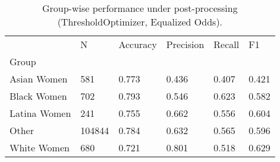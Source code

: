 \begin{table}[htbp]
\centering
\caption{Group-wise performance under post-processing (ThresholdOptimizer, Equalized Odds).}
\label{tab:12-postproc-group-metrics}
\begin{tabular}{llllll}
\toprule
 & N & Accuracy & Precision & Recall & F1 \\
Group &  &  &  &  &  \\
\midrule
Asian Women & 581 & 0.773 & 0.436 & 0.407 & 0.421 \\
Black Women & 702 & 0.793 & 0.546 & 0.623 & 0.582 \\
Latina Women & 241 & 0.755 & 0.662 & 0.556 & 0.604 \\
Other & 104844 & 0.784 & 0.632 & 0.565 & 0.596 \\
White Women & 680 & 0.721 & 0.801 & 0.518 & 0.629 \\
\bottomrule
\end{tabular}

\end{table}